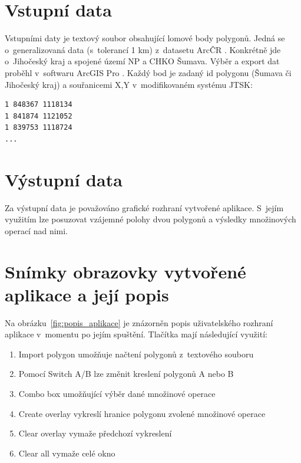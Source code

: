 \documentclass[a4paper, 12pt, oneside, titlepage]{article} %
\begin{document}
\section{Vstupní data}
Vstupními daty je textový soubor obsahující lomové body polygonů. Jedná se o~generalizovaná data (s~tolerancí 1 km) z~datasetu ArcČR \cite{arccr}. Konkrétně jde o~Jihočeský kraj a spojené území NP a CHKO Šumava. Výběr a export dat proběhl v~softwaru ArcGIS Pro \cite{arcgispro}. Každý bod je zadaný id polygonu (Šumava či Jihočeský kraj) a souřanicemi X,Y v~modifikovaném systému JTSK:

\begin{verbatim}
1 848367 1118134
1 841874 1121052
1 839753 1118724
...
\end{verbatim}



\section{Výstupní data}
Za výstupní data je považováno grafické rozhraní vytvořené aplikace. S~jejím využitím lze posuzovat vzájemné polohy dvou polygonů a výsledky množinových operací nad nimi.


\section{Snímky obrazovky vytvořené aplikace a její popis}\label{snimky}
Na obrázku~\ref{fig:popis_aplikace} je znázorněn popis uživatelského rozhraní aplikace v~momentu po jejím spuštění. Tlačítka mají následující využití:

\begin{enumerate}
\item Import polygon umožňuje načtení polygonů z~textového souboru
\item Pomocí Switch A/B lze změnit kreslení polygonů A nebo B
\item Combo box umožňující výběr dané množinové operace
\item Create overlay vykreslí hranice polygonu zvolené množinové operace
\item Clear overlay vymaže předchozí vykreslení
\item Clear all vymaže celé okno
\end{enumerate}
\end{document}
